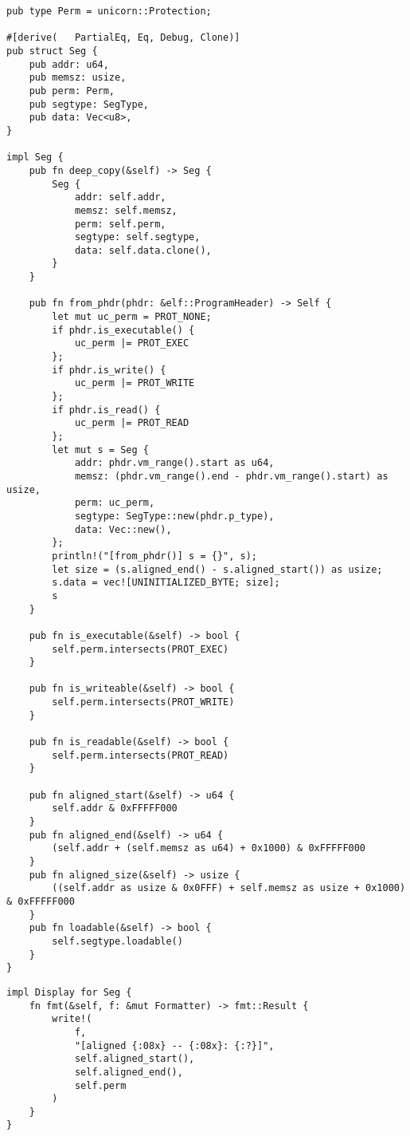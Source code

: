 \documentclass[11pt]{article}
\begin{document}
\lstset{language=rust,label=org5a6fe9d,caption= ,captionpos=b,numbers=none}
\begin{lstlisting}
pub type Perm = unicorn::Protection;

#[derive(   PartialEq, Eq, Debug, Clone)]
pub struct Seg {
    pub addr: u64,
    pub memsz: usize,
    pub perm: Perm,
    pub segtype: SegType,
    pub data: Vec<u8>,
}

impl Seg {
    pub fn deep_copy(&self) -> Seg {
        Seg {
            addr: self.addr,
            memsz: self.memsz,
            perm: self.perm,
            segtype: self.segtype,
            data: self.data.clone(),
        }
    }

    pub fn from_phdr(phdr: &elf::ProgramHeader) -> Self {
        let mut uc_perm = PROT_NONE;
        if phdr.is_executable() {
            uc_perm |= PROT_EXEC
        };
        if phdr.is_write() {
            uc_perm |= PROT_WRITE
        };
        if phdr.is_read() {
            uc_perm |= PROT_READ
        };
        let mut s = Seg {
            addr: phdr.vm_range().start as u64,
            memsz: (phdr.vm_range().end - phdr.vm_range().start) as usize,
            perm: uc_perm,
            segtype: SegType::new(phdr.p_type),
            data: Vec::new(),
        };
        println!("[from_phdr()] s = {}", s);
        let size = (s.aligned_end() - s.aligned_start()) as usize;
        s.data = vec![UNINITIALIZED_BYTE; size];
        s
    }

    pub fn is_executable(&self) -> bool {
        self.perm.intersects(PROT_EXEC)
    }

    pub fn is_writeable(&self) -> bool {
        self.perm.intersects(PROT_WRITE)
    }

    pub fn is_readable(&self) -> bool {
        self.perm.intersects(PROT_READ)
    }

    pub fn aligned_start(&self) -> u64 {
        self.addr & 0xFFFFF000
    }
    pub fn aligned_end(&self) -> u64 {
        (self.addr + (self.memsz as u64) + 0x1000) & 0xFFFFF000
    }
    pub fn aligned_size(&self) -> usize {
        ((self.addr as usize & 0x0FFF) + self.memsz as usize + 0x1000) & 0xFFFFF000
    }
    pub fn loadable(&self) -> bool {
        self.segtype.loadable()
    }
}
\end{lstlisting}

\lstset{language=rust,label=org9252707,caption= ,captionpos=b,numbers=none}
\begin{lstlisting}
impl Display for Seg {
    fn fmt(&self, f: &mut Formatter) -> fmt::Result {
        write!(
            f,
            "[aligned {:08x} -- {:08x}: {:?}]",
            self.aligned_start(),
            self.aligned_end(),
            self.perm
        )
    }
}
\end{lstlisting}
\end{document}
